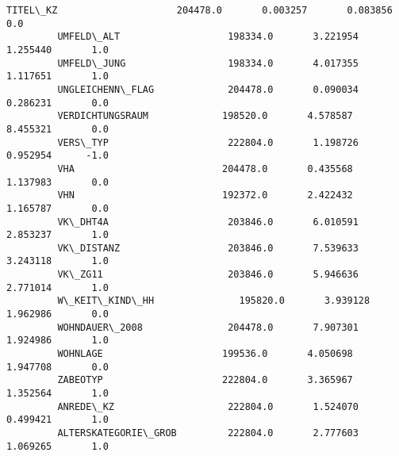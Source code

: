 \documentclass[11pt]{article}
\begin{document}
\begin{Verbatim}[commandchars=\\\{\}]
         TITEL\_KZ                     204478.0       0.003257       0.083856       0.0   
         UMFELD\_ALT                   198334.0       3.221954       1.255440       1.0   
         UMFELD\_JUNG                  198334.0       4.017355       1.117651       1.0   
         UNGLEICHENN\_FLAG             204478.0       0.090034       0.286231       0.0   
         VERDICHTUNGSRAUM             198520.0       4.578587       8.455321       0.0   
         VERS\_TYP                     222804.0       1.198726       0.952954      -1.0   
         VHA                          204478.0       0.435568       1.137983       0.0   
         VHN                          192372.0       2.422432       1.165787       0.0   
         VK\_DHT4A                     203846.0       6.010591       2.853237       1.0   
         VK\_DISTANZ                   203846.0       7.539633       3.243118       1.0   
         VK\_ZG11                      203846.0       5.946636       2.771014       1.0   
         W\_KEIT\_KIND\_HH               195820.0       3.939128       1.962986       0.0   
         WOHNDAUER\_2008               204478.0       7.907301       1.924986       1.0   
         WOHNLAGE                     199536.0       4.050698       1.947708       0.0   
         ZABEOTYP                     222804.0       3.365967       1.352564       1.0   
         ANREDE\_KZ                    222804.0       1.524070       0.499421       1.0   
         ALTERSKATEGORIE\_GROB         222804.0       2.777603       1.069265       1.0   
         

\end{Verbatim}
\end{document}
